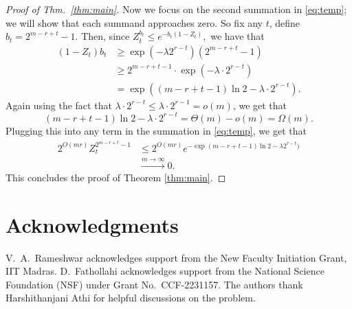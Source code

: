 \documentclass[conference,letterpaper]{IEEEtran}
\begin{document}
\begin{proof}[Proof of Thm.~\ref{thm:main}]
Now we focus on the second summation in \eqref{eq:temp}; we will show that each summand approaches zero. So fix any $t$, define $b_t = 2^{ m-r + t } - 1 $. Then, since
$
    Z_t^{b_t} \leq e^{- b_t(1-Z_t) },
$
we have that
\begin{equation*}
\begin{aligned}  
        (1-Z_t ) b_t  &\geq \exp (-\lambda 2^{r-t} ) (  2^{m-r+t}  - 1 ) \\
        &\geq   2^{m-r+t-1 }\cdot \exp (-\lambda\cdot 2^{r-t} )\\
        &= \exp\left({ ( m - r + t -1 )\ln 2 - \lambda\cdot 2^{r-t}}\right).
 \end{aligned}
\end{equation*}
Again using the fact that $ \lambda\cdot 2^{r-t}\leq \lambda\cdot 2^{r-1} = o(m) $, we get that
\begin{equation*}
    ( m - r + t -1 )\ln 2 - \lambda\cdot 2^{r-t} = \Theta(m) - o(m) = \Omega(m). 
\end{equation*}
Plugging this into any term in the summation in \eqref{eq:temp}, we get that 
\begin{equation*}
    \begin{aligned}
        2^{ O(mr) } Z_t^{2^ { m-r+t} -1 }  &\leq 2^{O(mr) } e^{ -\exp( m - r + t -1 )\ln 2 - \lambda 2^{r-t})} \\ 
        &\xrightarrow{m\to \infty} 0.
    \end{aligned}
\end{equation*}
This concludes the proof of Theorem \ref{thm:main}.
\end{proof}


\section*{Acknowledgments}
V.~A.~Rameshwar acknowledges support from the New Faculty Initiation Grant, IIT Madras.  D.~Fathollahi acknowledges support from the National Science Foundation (NSF) under Grant No.~CCF-2231157.
The authors thank Harshithanjani Athi for helpful discussions on the problem.


{\footnotesize
	}
\end{document}

